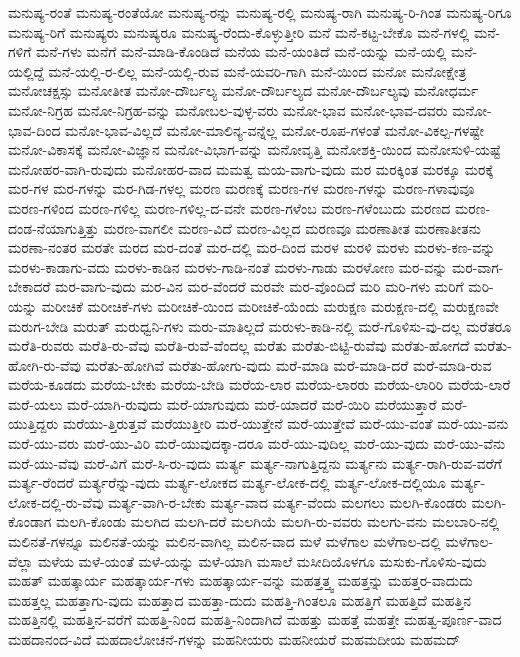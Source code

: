 {ಮನುಷ್ಯ-ರಂತೆ
ಮನುಷ್ಯ-ರಂತೆಯೋ
ಮನುಷ್ಯ-ರನ್ನು
ಮನುಷ್ಯ-ರಲ್ಲಿ
ಮನುಷ್ಯ-ರಾಗಿ
ಮನುಷ್ಯ-ರಿ-ಗಿಂತ
ಮನುಷ್ಯ-ರಿಗೂ
ಮನುಷ್ಯ-ರಿಗೆ
ಮನುಷ್ಯರು
ಮನುಷ್ಯರೂ
ಮನುಷ್ಯ-ರೆಂದು-ಕೊಳ್ಳುತ್ತೀರಿ
ಮನೆ
ಮನೆ-ಕಟ್ಟ-ಬೇಕೊ
ಮನೆ-ಗಳಲ್ಲಿ
ಮನೆ-ಗಳಿಗೆ
ಮನೆ-ಗಳು
ಮನೆಗೆ
ಮನೆ-ಮಾಡಿ-ಕೊಂಡಿದೆ
ಮನೆಯ
ಮನೆ-ಯಂತಿದೆ
ಮನೆ-ಯನ್ನು
ಮನೆ-ಯಲ್ಲಿ
ಮನೆ-ಯಲ್ಲಿದ್ದೆ
ಮನೆ-ಯಲ್ಲಿ-ರ-ಲಿಲ್ಲ
ಮನೆ-ಯಲ್ಲಿ-ರುವ
ಮನೆ-ಯವರಿ-ಗಾಗಿ
ಮನೆ-ಯಿಂದ
ಮನೋ
ಮನೋಕ್ಷೇತ್ರ
ಮನೋಚಕ್ಷಸ್ಸು
ಮನೋತೀತ
ಮನೋ-ದೌರ್ಬಲ್ಯ
ಮನೋ-ದೌರ್ಬಲ್ಯದ
ಮನೋ-ದೌರ್ಬಲ್ಯವು
ಮನೋಧರ್ಮ
ಮನೋ-ನಿಗ್ರಹ
ಮನೋ-ನಿಗ್ರಹ-ವನ್ನು
ಮನೋಬಲ-ವುಳ್ಳ-ವರು
ಮನೋ-ಭಾವ
ಮನೋ-ಭಾವ-ದವರು
ಮನೋ-ಭಾವ-ದಿಂದ
ಮನೋ-ಭಾವ-ವಿಲ್ಲದೆ
ಮನೋ-ಮಾಲಿನ್ಯ-ವನ್ನೆಲ್ಲ
ಮನೋ-ರೂಪ-ಗಳಂತೆ
ಮನೋ-ವಿಕಲ್ಪ-ಗಳಷ್ಟೇ
ಮನೋ-ವಿಕಾಸಕ್ಕೆ
ಮನೋ-ವಿಜ್ಞಾನ
ಮನೋ-ವಿಭಾಗ-ವನ್ನು
ಮನೋವೃತ್ತಿ
ಮನೋಶಕ್ತಿ-ಯಿಂದ
ಮನೋಸುಳಿ-ಯಷ್ಟೆ
ಮನೋಹರ-ವಾಗಿ-ರುವುದು
ಮನೋಹರ-ವಾದ
ಮಮತ್ವ
ಮಯ-ವಾಗು-ವುದು
ಮರ
ಮರಕ್ಕಿಂತ
ಮರಕ್ಕೂ
ಮರಕ್ಕೆ
ಮರ-ಗಳ
ಮರ-ಗಳನ್ನು
ಮರ-ಗಿಡ-ಗಳಲ್ಲ
ಮರಣ
ಮರಣಕ್ಕೆ
ಮರಣ-ಗಳ
ಮರಣ-ಗಳನ್ನು
ಮರಣ-ಗಳಾವುವೂ
ಮರಣ-ಗಳಿಂದ
ಮರಣ-ಗಳಿಲ್ಲ
ಮರಣ-ಗಳಿಲ್ಲ-ದ-ವನೇ
ಮರಣ-ಗಳೆಂಬ
ಮರಣ-ಗಳೆಂಬುದು
ಮರಣದ
ಮರಣ-ದಂಡ-ನೆಯಾಗುತ್ತಿತ್ತು
ಮರಣ-ವಾಗಲೀ
ಮರಣ-ವಿದೆ
ಮರಣ-ವಿಲ್ಲದ
ಮರಣವೂ
ಮರಣಾತೀತ
ಮರಣಾತೀತನು
ಮರಣಾ-ನಂತರ
ಮರತೇ
ಮರದ
ಮರ-ದಂತೆ
ಮರ-ದಲ್ಲಿ
ಮರ-ದಿಂದ
ಮರಳ
ಮರಳಿ
ಮರಳು
ಮರಳು-ಕಣ-ವನ್ನು
ಮರಳು-ಕಾಡಾಗು-ವದು
ಮರಳು-ಕಾಡಿನ
ಮರಳು-ಗಾಡಿ-ನಂತೆ
ಮರಳು-ಗಾಡು
ಮರಳೋಣ
ಮರ-ವನ್ನು
ಮರ-ವಾಗ-ಬೇಕಾದರೆ
ಮರ-ವಾಗು-ವುದು
ಮರ-ವಿನ
ಮರ-ವೆಂದರೆ
ಮರವೇ
ಮರ-ವೊಂದಿದೆ
ಮರಿ
ಮರಿ-ಗಳು
ಮರಿಗೆ
ಮರಿ-ಯನ್ನು
ಮರೀಚಿಕೆ
ಮರೀಚಿಕೆ-ಗಳು
ಮರೀಚಿಕೆ-ಯಿಂದ
ಮರೀಚಿಕೆ-ಯೆಂದು
ಮರುಕ್ಷಣ
ಮರುಕ್ಷಣ-ದಲ್ಲಿ
ಮರುಕ್ಷಣವೇ
ಮರುಗ-ಬೇಡಿ
ಮರುತ್
ಮರುಧ್ವನಿ-ಗಳು
ಮರು-ಮಾತಿಲ್ಲದೆ
ಮರುಳು-ಕಾಡಿ-ನಲ್ಲಿ
ಮರೆ-ಗೊಳಿಸು-ವು-ದಲ್ಲ
ಮರೆತರೂ
ಮರೆತಿ-ರುವರು
ಮರೆತಿ-ರು-ವೆವು
ಮರೆತಿ-ರುವೆ-ವೆಂದಲ್ಲ
ಮರೆತು
ಮರೆತು-ಬಿಟ್ಟಿ-ರುವೆವು
ಮರೆತು-ಹೋಗದೆ
ಮರೆತು-ಹೋಗಿ-ರು-ವೆವು
ಮರೆತು-ಹೋಗಿವೆ
ಮರೆತು-ಹೋಗು-ವುದು
ಮರೆ-ಮಾಡಿ
ಮರೆ-ಮಾಡಿ-ದರೆ
ಮರೆ-ಮಾಡಿ-ರುವ
ಮರೆಯ-ಕೂಡದು
ಮರೆಯ-ಬೇಕು
ಮರೆಯ-ಬೇಡಿ
ಮರೆಯ-ಲಾರ
ಮರೆಯ-ಲಾರರು
ಮರೆಯ-ಲಾರಿರಿ
ಮರೆಯ-ಲಾರೆ
ಮರೆ-ಯಲು
ಮರೆ-ಯಾಗಿ-ರುವುದು
ಮರೆ-ಯಾಗುವುದು
ಮರೆ-ಯಾದರೆ
ಮರೆ-ಯಿರಿ
ಮರೆಯುತ್ತಾರೆ
ಮರೆ-ಯುತ್ತಿದ್ದರು
ಮರೆಯು-ತ್ತಿರುತ್ತವೆ
ಮರೆಯುತ್ತೀರಿ
ಮರೆ-ಯುತ್ತೇನೆ
ಮರೆ-ಯುತ್ತೇವೆ
ಮರೆ-ಯು-ವಂತೆ
ಮರೆ-ಯು-ವನು
ಮರೆ-ಯು-ವರು
ಮರೆ-ಯು-ವಿರಿ
ಮರೆ-ಯುವುದಕ್ಕಾ-ದರೂ
ಮರೆ-ಯು-ವುದಿಲ್ಲ
ಮರೆ-ಯು-ವುದು
ಮರೆ-ಯು-ವೆನು
ಮರೆ-ಯು-ವೆವು
ಮರೆ-ವಿಗೆ
ಮರೆ-ಸಿ-ರು-ವುದು
ಮರ್ತ್ಯ
ಮರ್ತ್ಯ-ನಾಗುತ್ತಿದ್ದನು
ಮರ್ತ್ಯನು
ಮರ್ತ್ಯ-ರಾಗಿ-ರುವ-ವರೆಗೆ
ಮರ್ತ್ಯ-ರೆಂದರೆ
ಮರ್ತ್ಯರೆನ್ನು-ವುದು
ಮರ್ತ್ಯ-ಲೋಕದ
ಮರ್ತ್ಯ-ಲೋಕ-ದಲ್ಲಿ
ಮರ್ತ್ಯ-ಲೋಕ-ದಲ್ಲಿಯೂ
ಮರ್ತ್ಯ-ಲೋಕ-ದಲ್ಲಿ-ರು-ವೆವು
ಮರ್ತ್ಯ-ವಾಗಿ-ರ-ಬೇಕು
ಮರ್ತ್ಯ-ವಾದ
ಮರ್ತ್ಯ-ವೆಂದು
ಮಲಗಲು
ಮಲಗಿ-ಕೊಂಡರು
ಮಲಗಿ-ಕೊಂಡಾಗ
ಮಲಗಿ-ಕೊಂಡು
ಮಲಗಿದ
ಮಲಗಿ-ದರೆ
ಮಲಗಿಯೆ
ಮಲಗಿ-ರು-ವವರು
ಮಲಗು-ವನು
ಮಲಬಾರಿ-ನಲ್ಲಿ
ಮಲಿನತೆ-ಗಳನ್ನೂ
ಮಲಿನತೆ-ಯನ್ನು
ಮಲಿನ-ವಾಗಿಲ್ಲ
ಮಲಿನ-ವಾದ
ಮಳೆ
ಮಳೆಗಾಲ
ಮಳೆಗಾಲ-ದಲ್ಲಿ
ಮಳೆಗಾಲ-ವೆಲ್ಲಾ
ಮಳೆಯ
ಮಳೆ-ಯಂತೆ
ಮಳೆ-ಯನ್ನು
ಮಳೆ-ಯಾಗಿ
ಮಸಾಲೆ
ಮಸೀದಿಯೊಳಗೂ
ಮಸುಕು-ಗೊಳಿಸು-ವುದು
ಮಹತ್
ಮಹತ್ಕಾರ್ಯ
ಮಹತ್ಕಾರ್ಯ-ಗಳು
ಮಹತ್ಕಾರ್ಯ-ವನ್ನು
ಮಹತ್ತತ್ತ್ವ
ಮಹತ್ತನ್ನು
ಮಹತ್ತರ-ವಾದುದು
ಮಹತ್ತಲ್ಲ
ಮಹತ್ತಾಗು-ವುದು
ಮಹತ್ತಾದ
ಮಹತ್ತಾ-ದುದು
ಮಹತ್ತಿ-ಗಿಂತಲೂ
ಮಹತ್ತಿಗೆ
ಮಹತ್ತಿದೆ
ಮಹತ್ತಿನ
ಮಹತ್ತಿನಲ್ಲಿ
ಮಹತ್ತಿನ-ವರೆಗೆ
ಮಹತ್ತಿ-ನಿಂದ
ಮಹತ್ತಿ-ನಿಂದಾಗಿದೆ
ಮಹತ್ತು
ಮಹತ್ತೆ
ಮಹತ್ತೇ
ಮಹತ್ವ-ಪೂರ್ಣ-ವಾದ
ಮಹದಾನಂದ-ವಿದೆ
ಮಹದಾಲೋಚನೆ-ಗಳನ್ನು
ಮಹನೀಯರು
ಮಹನೀಯರೆ
ಮಹಮದೀಯ
ಮಹಮದ್
}
